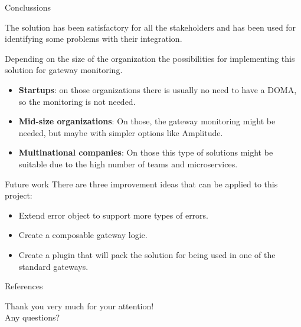\documentclass[10pt]{beamer}
\begin{document}
\begin{frame}{Conclussions}
    \begin{block}{}
        The solution has been satisfactory for all the stakeholders and has been used for identifying some problems with their integration.
    \end{block}
    
    Depending on the size of the organization the possibilities for implementing this solution for gateway monitoring.
    
    \begin{itemize}
        \item<3-> \textbf{Startups}: on those organizations there is usually no need to have a DOMA, so the monitoring is not needed.
        \item<4-> \textbf{Mid-size organizations}: On those, the gateway monitoring might be needed, but maybe with simpler options like Amplitude.
        \item<5-> \textbf{Multinational companies}: On those this type of solutions might be suitable due to the high number of teams and microservices.
    \end{itemize}
\end{frame}

\begin{frame}{Future work}
    There are three improvement ideas that can be applied to this project:
    
    \begin{itemize}
        \item<1-> Extend error object to support more types of errors.
        \item<2-> Create a composable gateway logic.
        \item<3-> Create a plugin that will pack the solution for being used in one of the standard gateways.
    \end{itemize}
\end{frame}

\begin{frame}[allowframebreaks]{References}

  
  

\end{frame}

\begin{frame}[standout]
    Thank you very much for your attention!\\
    Any questions?
\end{frame}
\end{document}
